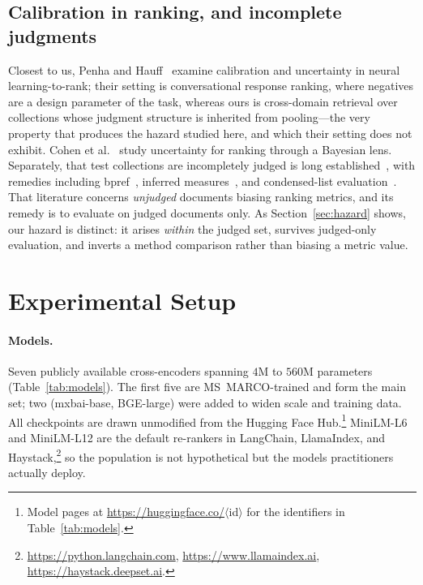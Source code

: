 \documentclass[sigconf,nonacm]{acmart}
\begin{document}
\subsection{Calibration in ranking, and incomplete judgments}
Closest to us, Penha and Hauff~\cite{penha2021} examine calibration and uncertainty in
neural learning-to-rank; their setting is conversational response ranking, where
negatives are a design parameter of the task, whereas ours is cross-domain retrieval
over collections whose judgment structure is inherited from pooling---the very
property that produces the hazard studied here, and which their setting does not
exhibit. Cohen et al.~\cite{cohen2021} study uncertainty for ranking through a
Bayesian lens. Separately, that test collections are incompletely judged is long
established~\cite{buckley2004,lu2016}, with remedies including bpref~\cite{buckley2004},
inferred measures~\cite{yilmaz2006}, and condensed-list evaluation~\cite{sakai2007}.
That literature concerns \emph{unjudged} documents biasing ranking metrics, and its
remedy is to evaluate on judged documents only. As Section~\ref{sec:hazard} shows,
our hazard is distinct: it arises \emph{within} the judged set, survives judged-only
evaluation, and inverts a method comparison rather than biasing a metric value.

\section{Experimental Setup}\label{sec:setup}

\paragraph{Models.}
Seven publicly available cross-encoders spanning $4$M to $560$M parameters
(Table~\ref{tab:models}). The first five are MS~MARCO-trained and form the main set;
two (mxbai-base, BGE-large) were added to widen scale and training data. All
checkpoints are drawn unmodified from the Hugging Face Hub.\footnote{Model pages at \url{https://huggingface.co/}$\langle$id$\rangle$ for the identifiers in Table~\ref{tab:models}.} MiniLM-L6 and MiniLM-L12 are the default re-rankers in LangChain, LlamaIndex, and Haystack,\footnote{\url{https://python.langchain.com}, \url{https://www.llamaindex.ai}, \url{https://haystack.deepset.ai}.} so the population is not hypothetical but the models practitioners actually deploy.
\end{document}
